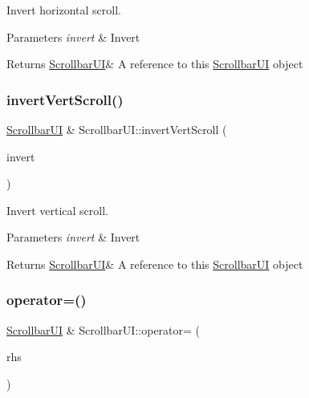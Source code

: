 Invert horizontal scroll. 


\begin{DoxyParams}{Parameters}
{\em invert} & Invert \\
\hline
\end{DoxyParams}
\begin{DoxyReturn}{Returns}
\hyperlink{class_scrollbar_u_i}{Scrollbar\+UI}\& A reference to \textquotesingle{}this\textquotesingle{} \hyperlink{class_scrollbar_u_i}{Scrollbar\+UI} object 
\end{DoxyReturn}
\mbox{\label{class_scrollbar_u_i_a3938a8a583e40efef2996bd76ec0b73e}} 
\subsubsection{\texorpdfstring{invert\+Vert\+Scroll()}{invertVertScroll()}}
{\footnotesize\ttfamily \hyperlink{class_scrollbar_u_i}{Scrollbar\+UI} \& Scrollbar\+U\+I\+::invert\+Vert\+Scroll (\begin{DoxyParamCaption}\item[{bool}]{invert }\end{DoxyParamCaption})}



Invert vertical scroll. 


\begin{DoxyParams}{Parameters}
{\em invert} & Invert \\
\hline
\end{DoxyParams}
\begin{DoxyReturn}{Returns}
\hyperlink{class_scrollbar_u_i}{Scrollbar\+UI}\& A reference to \textquotesingle{}this\textquotesingle{} \hyperlink{class_scrollbar_u_i}{Scrollbar\+UI} object 
\end{DoxyReturn}
\mbox{\label{class_scrollbar_u_i_a9cff2b43b275058afa3f3ba242c42e41}} 
\subsubsection{\texorpdfstring{operator=()}{operator=()}}
{\footnotesize\ttfamily \hyperlink{class_scrollbar_u_i}{Scrollbar\+UI} \& Scrollbar\+U\+I\+::operator= (\begin{DoxyParamCaption}\item[{\hyperlink{class_scrollbar_u_i}{Scrollbar\+UI} const \&}]{rhs }\end{DoxyParamCaption})}



